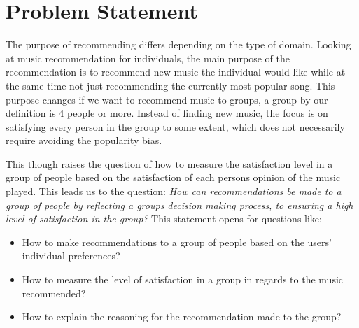 \section{Problem Statement}
The purpose of recommending differs depending on the type of domain. Looking at music recommendation for individuals, the main purpose of the recommendation is to recommend new music the individual would like while at the same time not just recommending the currently most popular song. This purpose changes if we want to recommend music to groups, a group by our definition is 4 people or more. Instead of finding new music, the focus is on satisfying every person in the group to some extent, which does not necessarily require avoiding the popularity bias. 

This though raises the question of how to measure the satisfaction level in a group of people based on the satisfaction of each persons opinion of the music played. This leads us to the question:
\textit{How can recommendations be made to a group of people by reflecting a groups decision making process, to ensuring a high level of satisfaction in the group?} This statement opens for questions like:
\begin{itemize}
\item How to make recommendations to a group of people based on the users' individual preferences?
\item How to measure the level of satisfaction in a group in regards to the music recommended?
\item How to explain the reasoning for the recommendation made to the group? 
\end{itemize}